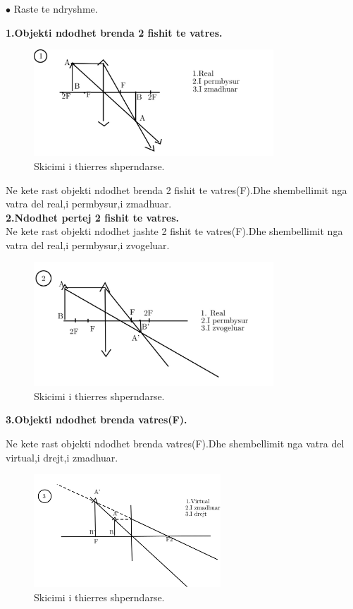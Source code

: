 \documentclass[twocolumn]{article}
\begin{document}
\begin{center}
	$\bullet$ Raste te ndryshme.\\
\end{center}



\textbf{1.Objekti ndodhet brenda  2 fishit te vatres.}\\

\begin{figure}[h]
	\includegraphics[width=90mm]{Imazhet/thj1.jpg}
	\caption{Skicimi i thierres shperndarse.}
	\label{fig:boat1}
\end{figure}

Ne kete rast objekti ndodhet brenda 2 fishit te vatres(F).Dhe shembellimit nga vatra del real,i permbysur,i zmadhuar.\\


\textbf{2.Ndodhet pertej 2 fishit te vatres.}\\
Ne kete rast objekti ndodhet jashte 2 fishit te vatres(F).Dhe shembellimit nga vatra del real,i permbysur,i zvogeluar.

\begin{figure}[h]
	\includegraphics[width=90mm]{Imazhet/thj2.jpg}
	\caption{Skicimi i thierres shperndarse.}
	\label{fig:boat1}
\end{figure}


\textbf{3.Objekti ndodhet brenda vatres(F).}

Ne kete rast objekti ndodhet brenda  vatres(F).Dhe shembellimit nga vatra del virtual,i drejt,i zmadhuar.
\begin{figure}[h]
	\includegraphics[width=70mm]{Imazhet/thj3.jpg}
	\caption{Skicimi i thierres shperndarse.}
	\label{fig:boat1}
\end{figure}
\end{document}
